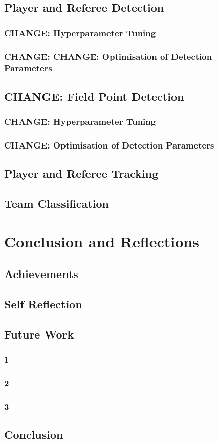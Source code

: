 \documentclass[12pt, letterpaper]{article}
\begin{document}
\subsection{Player and Referee Detection}
\subsubsection{\textbf{CHANGE}: Hyperparameter Tuning}
\subsubsection{\textbf{CHANGE}: \textbf{CHANGE}: Optimisation of Detection Parameters}
\subsection{\textbf{CHANGE}: Field Point Detection}
\subsubsection{\textbf{CHANGE}: Hyperparameter Tuning}
\subsubsection{\textbf{CHANGE}: Optimisation of Detection Parameters}
\subsection{Player and Referee Tracking}
\subsection{Team Classification}
\newpage

\section{Conclusion and Reflections}

\subsection{Achievements}
\subsection{Self Reflection}
\subsection{Future Work}
\subsubsection{1}
\subsubsection{2}
\subsubsection{3}
\subsection{Conclusion}
\newpage


\end{document}
